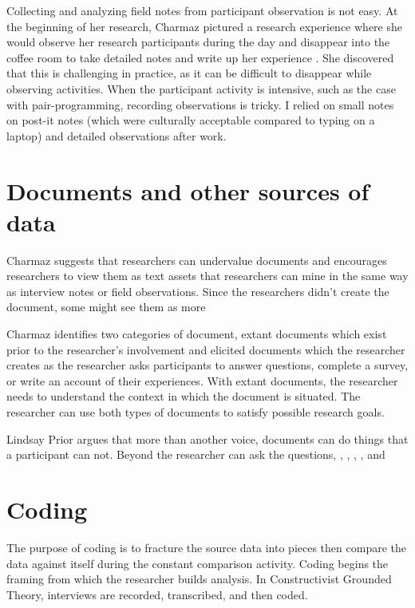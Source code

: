 Collecting and analyzing field notes from participant observation is not easy. At the beginning of her research, Charmaz pictured a research experience where she would observe her research participants during the day and disappear into the coffee room to take detailed notes and write up her experience \cite{Charmaz}. She discovered that this is challenging in practice, as it can be difficult to disappear while observing activities. When the participant activity is intensive, such as the case with pair-programming, recording observations is tricky. I relied on small notes on post-it notes (which were culturally acceptable compared to typing on a laptop) and detailed observations after work.

\section{Documents and other sources of data}
Charmaz suggests that researchers can undervalue documents and encourages researchers to view them as text assets that researchers can mine in the same way as interview notes or field observations. Since the researchers didn't create the document, some might see them  as more  

Charmaz identifies two categories of document, extant documents which exist prior to the researcher's involvement and elicited documents which the researcher creates as the researcher asks participants to answer questions, complete a survey, or write an account of their experiences. With extant documents, the researcher needs to understand the context in which the document is situated. The researcher can use both types of documents to satisfy possible research goals. 

Lindsay Prior \cite{Prior2003UsingDocuments} argues that more than another voice, documents can do things that a participant can not. Beyond  the researcher can ask the questions, , , , ,  and  
\section{Coding}
The purpose of coding is to fracture the source data into pieces then compare the data against itself during the constant comparison activity. Coding begins the framing from which the researcher builds analysis. In Constructivist Grounded Theory, interviews are recorded, transcribed, and then coded.

